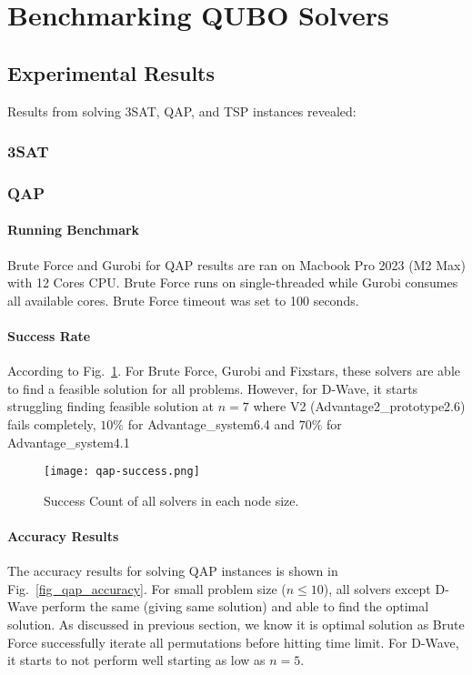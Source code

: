 \documentclass[conference]{IEEEtran}
\begin{document}
\section{Benchmarking QUBO Solvers}

\subsection{Experimental Results}
Results from solving 3SAT, QAP, and TSP instances revealed:

\subsubsection{3SAT}


\subsubsection{QAP}

\paragraph{Running Benchmark}

Brute Force and Gurobi for QAP results are ran on Macbook Pro 2023 (M2 Max) with 12 Cores CPU. Brute Force runs on single-threaded while Gurobi consumes all available cores. Brute Force timeout was set to 100 seconds.

\paragraph{Success Rate}

According to Fig.~\ref{fig_qap_success}. For Brute Force, Gurobi and Fixstars, these solvers are able to find a feasible solution for all problems. However, for D-Wave, it starts struggling finding feasible solution at $n = 7$ where V2 (Advantage2\_prototype2.6) fails completely, $10\%$ for Advantage\_system6.4 and $70\%$ for Advantage\_system4.1

\begin{figure}[htbp]
\centerline{\texttt{[image: qap-success.png]}}
\caption{Success Count of all solvers in each node size.}
\label{fig_qap_success}
\end{figure}

\paragraph{Accuracy Results}
The accuracy results for solving QAP instances is shown in Fig.~\ref{fig_qap_accuracy}. For small problem size ($n \le 10$), all solvers except D-Wave perform the same (giving same solution) and able to find the optimal solution. As discussed in previous section, we know it is optimal solution as Brute Force successfully iterate all permutations before hitting time limit. For D-Wave, it starts to not perform well starting as low as $n = 5$.
\end{document}
